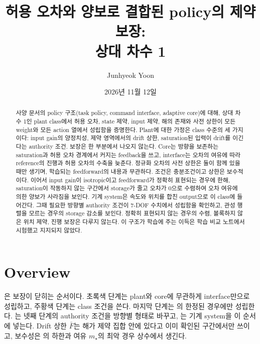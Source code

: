 \documentclass[11pt]{article}\usepackage[margin=1in]{geometry}\usepackage{amsmath,amssymb,amsthm,mathtools}\usepackage{graphicx}\graphicspath{{figures/}{../figures/}{figs/}{./}}\usepackage{enumitem}\usepackage{hyperref}\usepackage{cleveref}\usepackage{tikz}\usetikzlibrary{arrows.meta,positioning,calc,shapes.geometric}\usepackage{float}\usepackage[most]{tcolorbox}\usepackage{kotex}\usepackage{booktabs}\emergencystretch=1.6em\tolerance=2000 \crefname{assumption}{Assumption}{Assumptions}\Crefname{assumption}{Assumption}{Assumptions}\crefname{definition}{Definition}{Definitions}\Crefname{definition}{Definition}{Definitions}\crefname{proposition}{Proposition}{Propositions}\Crefname{proposition}{Proposition}{Propositions}\crefname{fact}{Fact}{Facts}\Crefname{fact}{Fact}{Facts} \newtheorem{assumption}{Assumption}\newtheorem{definition}{Definition}\newtheorem{lemma}{Lemma}\newtheorem{proposition}{Proposition}\newtheorem{theorem}{Theorem}\newtheorem{corollary}{Corollary}\newtheorem{fact}{Fact}\theoremstyle{remark}\newtheorem{remark}{Remark} \newcommand{\R}{\mathbb{R}}\newcommand{\U}{\mathcal U}
\title{허용 오차와 양보로 결합된 policy의 제약 보장:\\ 상대 차수 1}
\author{Junhyeok Yoon}
\date{2026년 11월 12일}
\begin{document}
\maketitle

\begin{abstract}
사양 문서의 policy 구조(task policy, command interface, adaptive core)에 대해, 상대 차수 1인 plant class에서 허용 오차, state 제약, input 제약, 해의 존재와 사전 상한이 모든 weight와 모든 action 열에서 성립함을 증명한다. Plant에 대한 가정은 class 수준의 세 가지이다: input gain의 양정치성, 제약 영역에서의 drift 상한, saturation된 입력이 drift를 이긴다는 authority 조건. 보장은 한 부분에서 나오지 않는다. Core는 방향을 보존하는 saturation과 허용 오차 경계에서 커지는 feedback을 쓰고, interface는 오차의 여유에 따라 reference의 진행과 허용 오차의 수축을 늦춘다. 정규화 오차의 사전 상한은 둘이 함께 있을 때만 생기며, 학습되는 feedforward의 내용과 무관하다. 조건은 충분조건이고 상한은 보수적이다. 이어서 input gain이 isotropic이고 feedforward가 정확히 표현되는 경우에 한해, saturation이 작동하지 않는 구간에서 storage가 줄고 오차가 0으로 수렴하여 오차 여유에 의한 양보가 사라짐을 보인다. 기계 system은 속도와 위치를 합친 output으로 이 class에 들어간다. 그때 필요한 방향별 authority 조건이 7-DOF 수치에서 성립함을 확인하고, 관성 행렬을 모르는 경우의 storage 감소를 보인다. 정확히 표현되지 않는 경우의 수렴, 볼록하지 않은 위치 제약, 진행 보장은 다루지 않는다. 이 구조가 학습에 주는 이득은 학습 비교 노트에서 시험했고 지지되지 않았다.
\end{abstract}

\section{Overview}
\label{sec:overview}

은 보장이 닫히는 순서이다. 초록색 단계는 plant와 core에 무관하게 interface만으로 성립하고, 주황색 단계는 class 조건을 쓴다. 마지막 단계는 의 한정된 경우에만 성립한다. 는 넷째 단계의 authority 조건을 방향별 형태로 바꾸고, 는 기계 system을 이 순서에 넣는다. Drift 상한 $\bar F$는 해가 제약 집합 안에 있다고 이미 확인된 구간에서만 쓰이고, 보수성은 의 하한과 여유 $m_\star$의 최악 경우 상수에서 생긴다.
\end{document}
